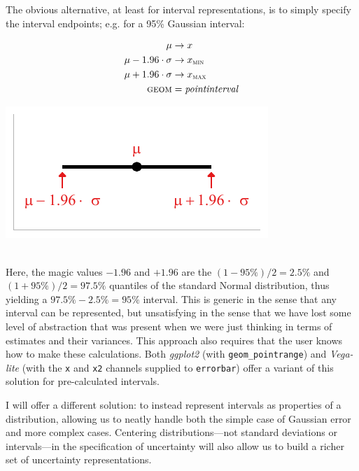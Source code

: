 \documentclass[journal]{vgtc}                     %
\newcommand{\equationfigure}[2]{%
\noindent
\begin{minipage}{.5\columnwidth}
\setlength{\abovedisplayskip}{0pt}
\setlength{\belowdisplayskip}{0pt}
#1\end{minipage}%
\begin{minipage}{.4\columnwidth}\centering #2 \end{minipage}%
\vspace{.5\belowdisplayskip}\\
}
\begin{document}
The obvious alternative, at least for interval representations, is to simply specify the interval endpoints; e.g. for a 95\% Gaussian interval:

\equationfigure{
\begin{align*}
\mu &\rightarrow x\\
\mu - 1.96 \cdot \sigma &\rightarrow x_\textsc{min}\\
\mu + 1.96 \cdot \sigma &\rightarrow x_\textsc{max}\\
\textsc{geom} &= \mathit{pointinterval}
\end{align*}
}{\includegraphics[width=1.2\columnwidth]{figs/2-xmin_xmax_interval.pdf}}
Here, the magic values $-1.96$ and $+1.96$ are the $(1-95\%)/2 = 2.5\%$ and $(1+95\%)/2 = 97.5\%$ quantiles of the standard Normal distribution, thus yielding a $97.5\% - 2.5\% = 95\%$ interval. This is generic in the sense that any interval can be represented, but unsatisfying in the sense that we have lost some level of abstraction that was present when we were just thinking in terms of estimates and their variances. This approach also requires that the user knows how to make these calculations. Both \textit{ggplot2} (with \texttt{geom\_pointrange}) and \textit{Vega-lite} (with the \texttt{x} and \texttt{x2} channels supplied to \texttt{errorbar}) offer a variant of this solution for pre-calculated intervals. 

I will offer a different solution: to instead represent intervals as properties of a distribution, allowing us to neatly handle both the simple case of Gaussian error and more complex cases. Centering distributions---not standard deviations or intervals---in the specification of uncertainty will also allow us to build a richer set of uncertainty representations.
\end{document}
